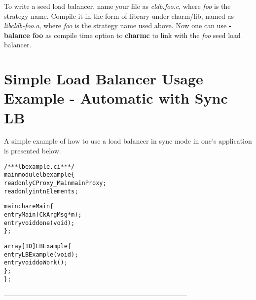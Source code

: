 To write a seed load balancer, name your file as {\em cldb.foo.c},
where {\em foo} is the strategy name.  Compile it in the form of library
under charm/lib, named as {\em libcldb-foo.a}, where {\em foo} is the strategy 
name used above. Now one can use {\bf -balance foo} as compile time option
to {\bf charmc} to link with the {\em foo} seed load balancer.

\section{Simple Load Balancer Usage Example - Automatic with Sync LB}
\label{lbexample}

A simple example of how to use a load balancer in sync mode in one's
application is presented below.

\begin{alltt}
/*** lbexample.ci ***/
mainmodule lbexample \{
  readonly CProxy_Main mainProxy;
  readonly int nElements;

  mainchare Main \{
    entry Main(CkArgMsg *m);
    entry void done(void);
  \};

  array [1D] LBExample \{
    entry LBExample(void);
    entry void doWork();
  \};
\};
\end{alltt}

--------------------------------------------------------------------------------

